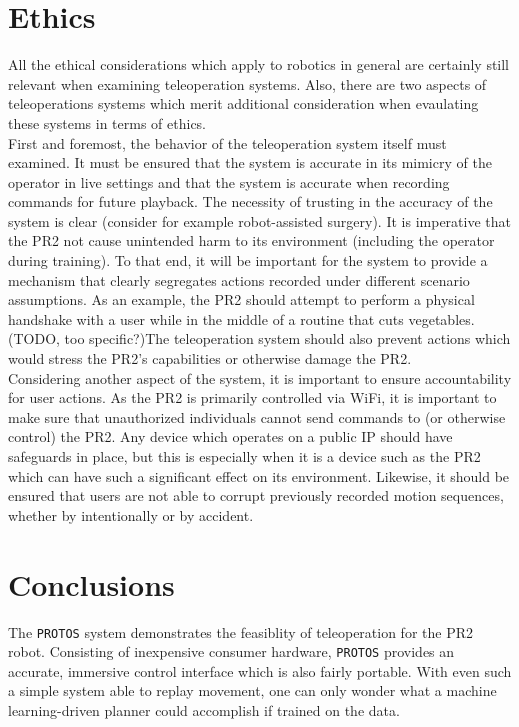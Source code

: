 \documentclass{sig-alternate}
\begin{document}
\section{Ethics}
\label{sec:ethics}All the ethical considerations which apply to robotics in 
general are certainly still relevant when examining teleoperation systems.
Also, there are two aspects of teleoperations systems which merit additional
consideration when evaulating these systems in terms of ethics. \\
\indent First and foremost, the behavior of the teleoperation system itself 
must examined. It must be ensured that the system is accurate in its mimicry
of the operator in live settings and that the system is accurate when
recording commands for future playback. The necessity of trusting in the
accuracy of the system is clear (consider for example robot-assisted surgery).
It is imperative that the PR2 not cause unintended harm to its environment
(including the operator during training). To that end, it will be important
for the system to provide a mechanism that clearly segregates actions recorded 
under different scenario assumptions. As an example, the PR2 should attempt to 
perform a physical handshake with a user while  in the middle of a routine
that cuts vegetables. (TODO, too specific?)The teleoperation system should also
prevent actions which would stress the PR2's capabilities or otherwise
damage the PR2.\\
\indent Considering another aspect of the system, it is important to ensure
accountability 
for user actions. As the PR2 is primarily controlled via WiFi, it is important
to make sure that unauthorized individuals cannot send commands to (or 
otherwise control) the PR2. Any device which operates on a public IP should 
have safeguards in place, but this is especially when it is a device such as
the PR2 which can have such a significant effect on its environment.
Likewise, it should be ensured that users are
not able to corrupt previously recorded motion sequences, whether by 
intentionally or by accident.
\section{Conclusions}
\label{sec:conclusions}
The {\tt PROTOS} system demonstrates the feasiblity of teleoperation for the
PR2 robot. Consisting of inexpensive consumer hardware, {\tt PROTOS}
provides an accurate, immersive control interface which is also fairly 
portable. With even such a simple system able to replay movement, one can
only wonder what a machine learning-driven planner could accomplish if trained
on the data.
\end{document}
